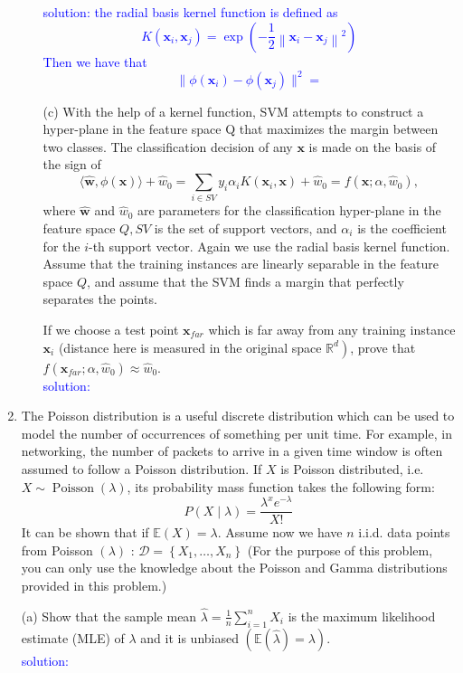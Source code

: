 \documentclass[10pt]{article}
\begin{document}
\begin{enumerate}[1.]
\begin{itemize}
\textcolor{blue}{solution: the radial basis kernel function is defined as $$K\left(\mathbf{x}_{i}, \mathbf{x}_{j}\right)=\exp \left(-\frac{1}{2}\left\|\mathbf{x}_{i}-\mathbf{x}_{j}\right\|^{2}\right)$$
    Then we have that $$\parallel\phi(\mathbf{x}_{i}) - \phi(\mathbf{x}_{j})\parallel^2 = $$}

\item[(c)] With the help of a kernel function, SVM attempts to construct a hyper-plane in the feature space  Q  that maximizes the margin between two classes. The classification decision of any  $\mathbf{x}$  is made on the basis of the sign of$$
\langle\hat{\mathbf{w}}, \phi(\mathbf{x})\rangle+\hat{w}_0=\sum_{i \in S V} y_i \alpha_i K\left(\mathbf{x}_i, \mathbf{x}\right)+\hat{w}_0=f\left(\mathbf{x} ; \alpha, \hat{w}_0\right),
$$
where $\hat{\mathbf{w}}$ and $\hat{w}_0$ are parameters for the classification hyper-plane in the feature space $Q, S V$ is the set of support vectors, and $\alpha_i$ is the coefficient for the $i$-th support vector. Again we use the radial basis kernel function. Assume that the training instances are linearly separable in the feature space $Q$, and assume that the SVM finds a margin that perfectly separates the points.

If we choose a test point $\mathbf{x}_{f a r}$ which is far away from any training instance $\mathbf{x}_i$ (distance here is measured in the original space $\left.\mathbb{R}^d\right)$, prove that $f\left(\mathbf{x}_{f a r} ; \alpha, \hat{w}_0\right) \approx \hat{w}_0$.
\\
\textcolor{blue}{solution:}

\end{itemize}
\newpage
\item {}The Poisson distribution is a useful discrete distribution which can be used to model the number of occurrences of something per unit time. For example, in networking, the number of packets to arrive in a given time window is often assumed to follow a Poisson distribution. If $X$ is Poisson distributed, i.e. $X \sim \operatorname{Poisson}(\lambda)$, its probability mass function takes the following form:
$$
P(X \mid \lambda)=\frac{\lambda^x e^{-\lambda}}{X !}
$$
It can be shown that if $\mathbb{E}(X)=\lambda$. Assume now we have $n$ i.i.d. data points from Poisson $(\lambda)$ : $\mathcal{D}=\left\{X_1, \ldots, X_n\right\}$
(For the purpose of this problem, you can only use the knowledge about the Poisson and Gamma distributions provided in this problem.)
\item[(a)] Show that the sample mean $\hat{\lambda}=\frac{1}{n} \sum_{i=1}^n X_i$ is the maximum likelihood estimate (MLE) of $\lambda$ and it is unbiased $(\mathbb{E}(\hat{\lambda})=\lambda)$. 
\\
\textcolor{blue}{solution:}



\end{enumerate}
\end{document}
